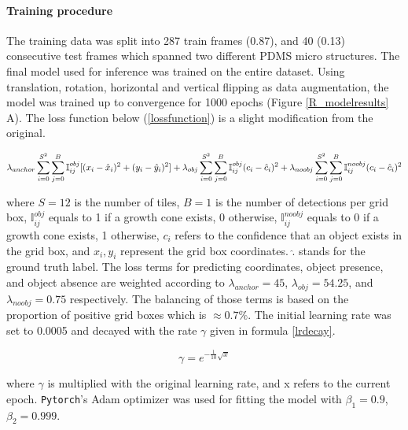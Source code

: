 \paragraph{Training procedure}
The training data was split into 287 train frames (0.87), and 40 (0.13)
consecutive test frames which spanned two different PDMS micro structures. The
final model used for inference was trained on the entire dataset. Using
translation, rotation, horizontal and vertical flipping as data augmentation,
the model was trained up to convergence for 1000 epochs (Figure
\ref{R_modelresults} A). The loss function below (\ref{lossfunction}) is a
slight modification from the original.

\begin{equation}
    \lambda_{anchor}\sum_{i=0}^{S^2}\sum_{j=0}^B \mathbb{I}_{ij}^{obj}[(x_i-\hat{x}_i)^2 + (y_i-\hat{y}_i)^2 ] \\
    + \lambda_{obj}\sum_{i=0}^{S^2}\sum_{j=0}^B \mathbb{I}_{ij}^{obj}(c_i - \hat{c}_i)^2 \\
    + \lambda_{noobj}\sum_{i=0}^{S^2}\sum_{j=0}^B \mathbb{I}_{ij}^{noobj}(c_i - \hat{c}_i)^2 \\
    \label{lossfunction}
\end{equation}

\vspace{3mm}
\noindent
where $S = 12$ is the number of tiles, $B = 1$ is the number of detections per
grid box, $\mathbb{I}_{ij}^{obj}$ equals to 1 if a growth cone exists, 0
otherwise, $\mathbb{I}_{ij}^{noobj}$ equals to 0 if a growth cone exists, 1
otherwise, $c_i$ refers to the confidence that an object exists in the grid box,
and $x_i, y_i$ represent the grid box coordinates. $\hat{.}$ stands for the
ground truth label. The loss terms for predicting coordinates, object presence,
and object absence are weighted according to $\lambda_{anchor} = 45$,
$\lambda_{obj} = 54.25$, and $\lambda_{noobj} = 0.75$ respectively. The
balancing of those terms is based on the proportion of positive grid boxes which
is $\approx 0.7\%$. The initial learning rate was set to 0.0005 and decayed
with the rate $\gamma$ given in formula \ref{lrdecay}.

\begin{equation}
    \gamma = e^{-\frac{1}{10}\sqrt{x}}
    \label{lrdecay}
\end{equation}

\noindent
where $\gamma$ is multiplied with the original learning rate, and x refers to
the current epoch. \verb|Pytorch|'s Adam optimizer \parencite{adam} was used
for fitting the model with $\beta_1 = 0.9$, $\beta_2 = 0.999$.

